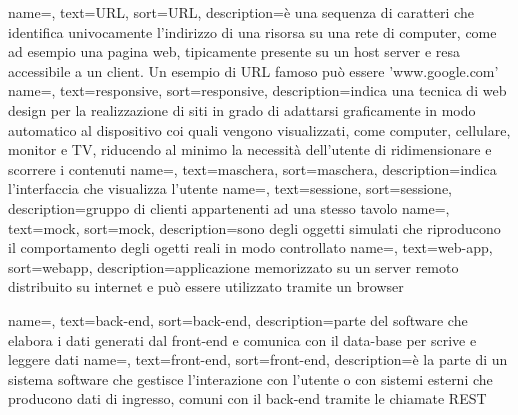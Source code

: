 {
    name=,
    text=URL,
    sort=URL,
    description={è una sequenza di caratteri che identifica univocamente l'indirizzo di una risorsa su una rete di computer, come ad esempio una pagina web, tipicamente presente su un host server e resa accessibile a un client. Un esempio di URL famoso può essere 'www.google.com'}
}
{
    name=,
    text=responsive,
    sort=responsive,
    description={indica una tecnica di web design per la realizzazione di siti in grado di adattarsi graficamente in modo automatico al dispositivo coi quali vengono visualizzati, come computer, cellulare, monitor e TV, riducendo al minimo la necessità dell'utente di ridimensionare e scorrere i contenuti}
}
{
    name=,
    text=maschera,
    sort=maschera,
    description={indica l'interfaccia che visualizza l'utente}
}
{
    name=,
    text=sessione,
    sort=sessione,
    description={gruppo di clienti appartenenti ad una stesso tavolo}
}
{
    name=,
    text=mock,
    sort=mock,
    description={sono degli oggetti simulati che riproducono il comportamento degli ogetti reali in modo controllato}
}
{
    name=,
    text=web-app,
    sort=webapp,
    description={applicazione memorizzato su un server remoto distribuito su internet e può essere utilizzato tramite un browser}
}

{
    name=,
    text=back-end,
    sort=back-end,
    description={parte del software che elabora i dati generati dal front-end e comunica con il data-base per scrive e leggere dati}
}
{
    name=,
    text=front-end,
    sort=front-end,
    description={è la parte di un sistema software che gestisce l'interazione con l'utente o con sistemi esterni che producono dati di ingresso, comuni con il back-end tramite le chiamate REST}
}





